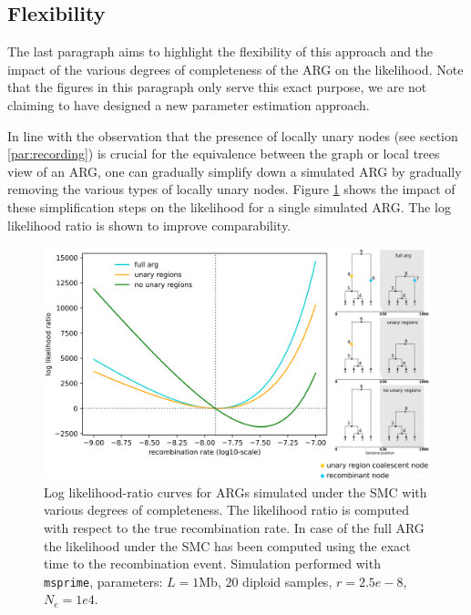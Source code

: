 \documentclass{article}
\begin{document}
\subsection{Flexibility}
The last paragraph aims to highlight the flexibility of this approach 
and the impact of the various
degrees of completeness of the ARG on the likelihood.
Note that the figures in this paragraph only serve this exact purpose,
we are not claiming to have designed a new parameter estimation approach.

In line with the observation that the presence of locally unary nodes 
(see section \ref{par:recording}) is crucial for the equivalence between
the graph or local trees view of an ARG, one can gradually simplify down
a simulated ARG by gradually removing the various types of locally unary nodes.
Figure \ref{fig:lik-surface} shows the impact of these simplification steps
on the likelihood for a single simulated ARG.
The log likelihood ratio is shown to improve comparability.

\begin{figure}[!ht]
    \centering
    \includegraphics[width=\textwidth]{figures/likratio.png}
    \caption{Log likelihood-ratio curves for ARGs simulated under the SMC with
    various degrees of completeness. The likelihood ratio is computed with
    respect to the true recombination rate. In case of the full ARG the likelihood
    under the SMC has been computed using the exact time to the recombination event.
    Simulation performed with \texttt{msprime}, parameters: $L=1$Mb, $20$ diploid samples,
    $r=2.5e-8$, $N_e=1e4$.}
    \label{fig:lik-surface}
\end{figure}
\end{document}
